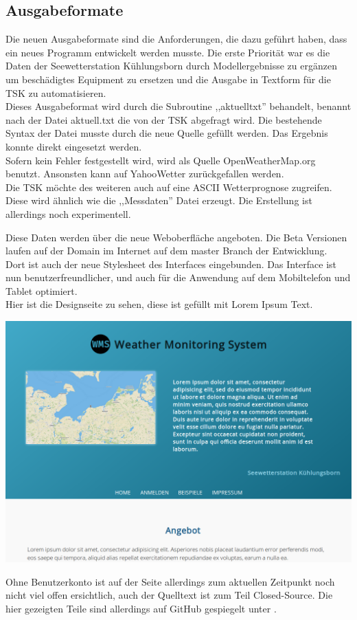\subsection{Ausgabeformate}
Die neuen Ausgabeformate sind die Anforderungen, die dazu geführt haben, dass ein neues Programm
entwickelt werden musste. Die erste Priorität war es die Daten der Seewetterstation Kühlungsborn
durch Modellergebnisse zu ergänzen um beschädigtes Equipment zu ersetzen und die Ausgabe in Textform
für die TSK zu automatisieren.\\
Dieses Ausgabeformat wird durch die Subroutine ,,aktuelltxt'' behandelt, benannt nach der Datei aktuell.txt
die von der TSK abgefragt wird. Die bestehende Syntax der Datei musste durch die neue Quelle gefüllt
werden. Das Ergebnis konnte direkt eingesetzt werden.\\

Sofern kein Fehler festgestellt wird, wird als Quelle OpenWeatherMap.org benutzt. Ansonsten kann auf
YahooWetter zurückgefallen werden.\\
Die TSK möchte des weiteren auch auf eine ASCII Wetterprognose zugreifen. Diese wird ähnlich wie die
,,Messdaten'' Datei erzeugt. Die Erstellung ist allerdings noch experimentell.

Diese Daten werden über die neue Weboberfläche angeboten. Die Beta Versionen
laufen auf der Domain  im Internet auf dem master Branch der
Entwicklung.\\
Dort ist auch der neue Stylesheet des Interfaces eingebunden. Das Interface
ist nun benutzerfreundlicher, und auch für die Anwendung auf dem Mobiltelefon und Tablet optimiert.\\
Hier ist die Designseite zu sehen, diese ist gefüllt mit Lorem Ipsum Text.
\begin{center}
    \includegraphics[width=\linewidth]{imgs/wms20.png}
\end{center}
Ohne Benutzerkonto ist auf der Seite allerdings zum aktuellen Zeitpunkt noch
nicht viel offen ersichtlich, auch der Quelltext ist zum Teil Closed-Source.
Die hier gezeigten Teile sind allerdings auf GitHub gespiegelt unter
.


